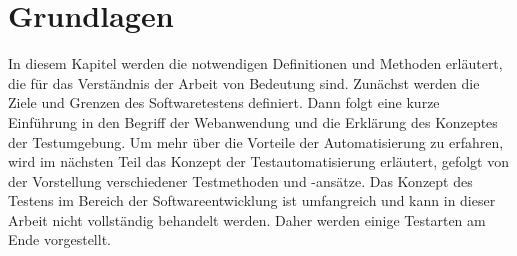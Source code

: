 \chapter{Grundlagen}\label{ch:grundlagen}

In diesem Kapitel werden die notwendigen Definitionen und Methoden erläutert,
die für das Verständnis der Arbeit von Bedeutung sind. Zunächst werden die
Ziele und Grenzen des Softwaretestens definiert. Dann folgt eine kurze
Einführung in den Begriff der Webanwendung und  die Erklärung des Konzeptes
der Testumgebung. Um mehr über die Vorteile der Automatisierung zu erfahren,
wird im nächsten Teil das Konzept der Testautomatisierung erläutert, gefolgt
von der Vorstellung verschiedener Testmethoden und -ansätze. Das Konzept des
Testens im Bereich der Softwareentwicklung ist umfangreich und kann in dieser
Arbeit nicht vollständig behandelt werden. Daher werden einige
Testarten am Ende vorgestellt.











